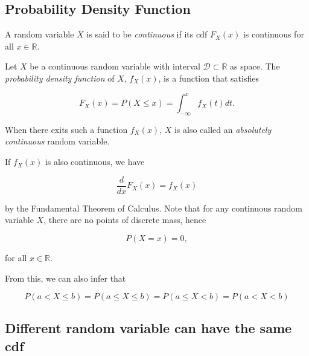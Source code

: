 \documentclass{article}
\begin{document}
        \subsection{Probability Density Function}

            A random variable $ X $ is said to be \textit{continuous} if
            its cdf $ F_{X}(x) $ is continuous for all $ x \in \mathbb{R} $.

            Let $ X $ be a continuous random variable with interval $
            \mathcal{D} \subset \mathbb{R} $ as space. The \textit{probability
            density function} of $ X $, $ f_{X}(x) $, is a function that
            satisfies

            \begin{equation*}
                F_{X}(x) = P(X \leq x) = \int_{-\infty}^{x} f_{X}(t) dt.
            \end{equation*}

            When there exits such a function $ f_{X}(x) $, $ X $ is also called an
            \textit{absolutely continuous} random variable.

            If $ f_{X}(x) $ is also continuous, we have

            \begin{equation*}
                 \frac{d}{dx} F_{X}(x) = f_{X}(x)
            \end{equation*}

            by the Fundamental Theorem of Calculus. Note that for any continuous
            random variable $ X $, there are no points of discrete mass, hence

            \begin{equation*}
                 P(X = x) = 0,
            \end{equation*}

            for all $ x \in \mathbb{R} $.

            From this, we can also infer that

            \begin{equation*}
                 P ( a < X \leq b ) = P ( a \leq X \leq b) = P ( a \leq X < b)
                     = P ( a < X < b)
            \end{equation*}

        \subsection{Different random variable can have the same cdf}
\end{document}
